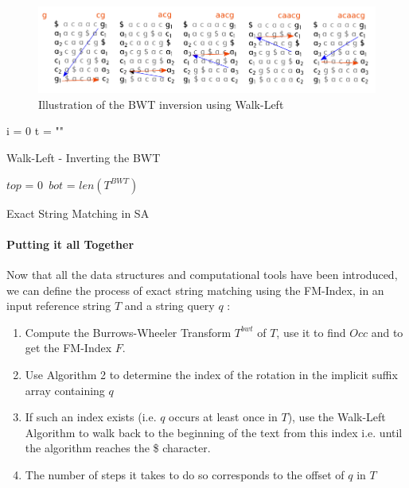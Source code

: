 \begin{figure}[H]
    \centering
    \includegraphics[scale=0.5]{Figures/WL.png}
    \caption{Illustration of the BWT inversion using Walk-Left\cite{genomic}}
    \label{fig:walkleft}
\end{figure}

\begin{minipage}[t]{0.45\textwidth}
\begin{algorithm}[H]
	\SetAlgoLined
	i = 0\;
	t = ""\;
\caption{Walk-Left - Inverting the BWT}
\label{alg:WL}
\end{algorithm}
\end{minipage}
\begin{minipage}[t]{0.45\textwidth}
\begin{algorithm}[H]
\SetAlgoLined
{}
	$top$ = 0\
	$bot$ = $len(T^{BWT})$\;
\caption{Exact String Matching in SA}
\label{alg:match}
\end{algorithm}
\end{minipage}

\vspace*{5mm}


\paragraph{Putting it all Together}

Now that all the data structures and computational tools have been introduced, we can define the process of exact string matching using the FM-Index, in an input reference string $T$ and a string query $q$ :
\begin{enumerate}
\item Compute the Burrows-Wheeler Transform $T^{bwt}$ of $T$, use it to find $Occ$ and to get the FM-Index $F$.
\item Use Algorithm 2 to determine the index of the rotation in the implicit suffix array containing $q$
\item If such an index exists (i.e. $q$ occurs at least once in $T$), use the Walk-Left Algorithm to walk back to the beginning of the text from this index i.e. until the algorithm reaches the \$ character.
\item The number of steps it takes to do so corresponds to the offset of $q$ in $T$
\end{enumerate}


